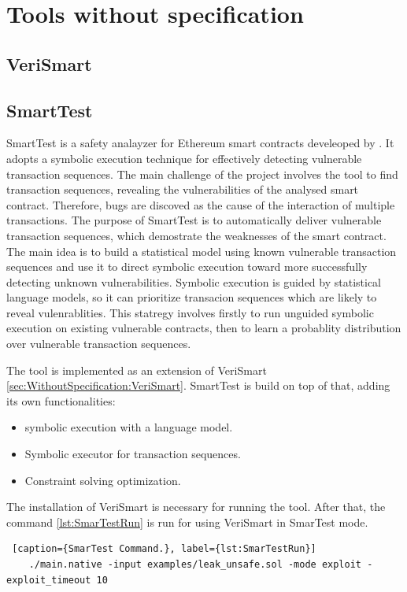 \section{Tools without specification}
\label{sec:Tools:WithoutSpecification}

\subsection{VeriSmart}
\label{sec:WithoutSpecification:VeriSmart}

\subsection{SmartTest}
\label{sec:WithoutSpecification:SmartTest}

SmartTest is a safety analayzer for Ethereum smart contracts develeoped by \citet{SmarTest}. 
It adopts a symbolic execution technique for effectively detecting vulnerable transaction sequences. 
The main challenge of the project involves the tool to find transaction sequences,
revealing the vulnerabilities of the analysed smart contract. Therefore, bugs are discoved as the cause of the interaction of multiple transactions.
The purpose of SmartTest is to automatically deliver vulnerable transaction sequences, 
which demostrate the weaknesses of the smart contract.
The main idea is to build a statistical model using known vulnerable transaction sequences and use it to direct symbolic execution toward 
more successfully detecting unknown vulnerabilities. 
Symbolic execution is guided by statistical language models, so it can prioritize transacion sequences which are likely to reveal vulenrablities.
This statregy involves firstly to run unguided symbolic
execution on existing vulnerable contracts, then to learn a probablity distribution over vulnerable transaction sequences.

The tool is implemented as an extension of VeriSmart \autoref{sec:WithoutSpecification:VeriSmart}.
SmartTest is build on top of that, adding its own functionalities:
\begin{itemize}
    \item symbolic execution with a language model.
    \item Symbolic executor for transaction sequences.
    \item Constraint solving optimization.
\end{itemize}
The installation of VeriSmart is necessary for running the tool. After that, the command \autoref{lst:SmarTestRun} is run for using VeriSmart in SmarTest mode.
\begin{lstlisting} [caption={SmarTest Command.}, label={lst:SmarTestRun}]
    ./main.native -input examples/leak_unsafe.sol -mode exploit -exploit_timeout 10
\end{lstlisting}

